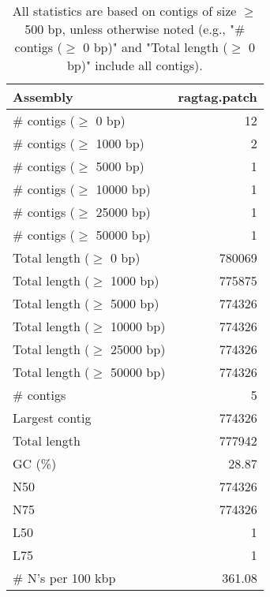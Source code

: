 \documentclass[12pt,a4paper]{article}
\begin{document}
\begin{table}[ht]
\begin{center}
\caption{All statistics are based on contigs of size $\geq$ 500 bp, unless otherwise noted (e.g., "\# contigs ($\geq$ 0 bp)" and "Total length ($\geq$ 0 bp)" include all contigs).}
\begin{tabular}{|l*{1}{|r}|}
\hline
Assembly & ragtag.patch \\ \hline
\# contigs ($\geq$ 0 bp) & 12 \\ \hline
\# contigs ($\geq$ 1000 bp) & 2 \\ \hline
\# contigs ($\geq$ 5000 bp) & 1 \\ \hline
\# contigs ($\geq$ 10000 bp) & 1 \\ \hline
\# contigs ($\geq$ 25000 bp) & 1 \\ \hline
\# contigs ($\geq$ 50000 bp) & 1 \\ \hline
Total length ($\geq$ 0 bp) & 780069 \\ \hline
Total length ($\geq$ 1000 bp) & 775875 \\ \hline
Total length ($\geq$ 5000 bp) & 774326 \\ \hline
Total length ($\geq$ 10000 bp) & 774326 \\ \hline
Total length ($\geq$ 25000 bp) & 774326 \\ \hline
Total length ($\geq$ 50000 bp) & 774326 \\ \hline
\# contigs & 5 \\ \hline
Largest contig & 774326 \\ \hline
Total length & 777942 \\ \hline
GC (\%) & 28.87 \\ \hline
N50 & 774326 \\ \hline
N75 & 774326 \\ \hline
L50 & 1 \\ \hline
L75 & 1 \\ \hline
\# N's per 100 kbp & 361.08 \\ \hline
\end{tabular}
\end{center}
\end{table}
\end{document}
